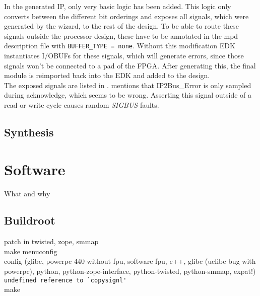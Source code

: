 \documentclass[11pt,technote,a4paper,onecolumn]{IEEEtran}
\newcommand{\signal}[1]{{\ttfamily #1}}
\begin{document}
In the generated IP, only very basic logic has been added. This logic only
converts between the different bit orderings and exposes all signals, which
were generated by the wizard, to the rest of the design. To be able to route
these signals outside the processor design, these have to be annotated in the
mpd description file with \verb+BUFFER_TYPE = none+. Without this modification
EDK instantiates I/OBUFs for these signals, which will generate errors,
since those signals won't be connected to a pad of the FPGA. After generating
this, the final module is reimported back into the EDK and added to the
design.\\
The exposed signals are listed in \cite{slave_burst}. \cite[p. 14]{slave_burst}
mentions that \signal{IP2Bus\_Error} is only sampled during acknowledge, which
seems to be wrong. Asserting this signal outside of a read or write cycle
causes random \emph{SIGBUS} faults.
\subsection{Synthesis}
\label{sec:synthesis}
\section{Software}
What and why
\subsection{Buildroot}
patch in twisted, zope, smmap\\
make menuconfig\\
config (glibc, powerpc 440 without fpu, software fpu, c++, glibc (uclibc bug with powerpc), python, python-zope-interface, python-twisted, python-smmap, expat!)\\
\verb+undefined reference to `copysignl'+\\
make
\end{document}
